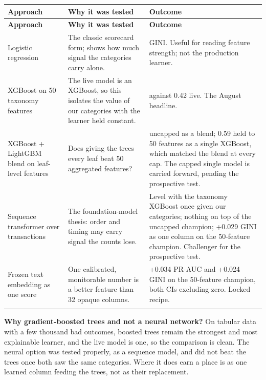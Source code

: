 {\small
\setlength{\TableWidth}{\dimexpr\linewidth-6\tabcolsep\relax}
\begin{longtable}{>{\raggedright\arraybackslash}p{0.29\TableWidth}>{\raggedright\arraybackslash}p{0.26\TableWidth}>{\raggedright\arraybackslash}p{0.45\TableWidth}}
\rowcolor{BlueTint}
\bfseries Approach & \bfseries Why it was tested & \bfseries Outcome \\ \midrule
\endfirsthead
\rowcolor{BlueTint}
\bfseries Approach & \bfseries Why it was tested & \bfseries Outcome \\ \midrule
\endhead
Logistic regression & The classic scorecard form; shows how much signal the categories carry alone. & 0.33 GINI. Useful for reading feature strength; not the production learner. \\ \addlinespace[4pt]
XGBoost on 50 taxonomy features & The live model is an XGBoost, so this isolates the value of our categories with the learner held constant. & 0.56 against 0.42 live. The August headline. \\ \addlinespace[4pt]
XGBoost + LightGBM blend on leaf-level features & Does giving the trees every leaf beat 50 aggregated features? & 0.62 uncapped as a blend; 0.59 held to 50 features as a single XGBoost, which matched the blend at every cap. The capped single model is carried forward, pending the prospective test. \\ \addlinespace[4pt]
Sequence transformer over transactions & The foundation-model thesis: order and timing may carry signal the counts lose. & Level with the taxonomy XGBoost once given our categories; nothing on top of the uncapped champion; +0.029 GINI as one column on the 50-feature champion. Challenger for the prospective test. \\ \addlinespace[4pt]
Frozen text embedding as one score & One calibrated, monitorable number is a better feature than 32 opaque columns. & +0.034 PR-AUC and +0.024 GINI on the 50-feature champion, both CIs excluding zero. Locked recipe. \\ \addlinespace[4pt]
\bottomrule
\end{longtable}}
\textbf{Why gradient-boosted trees and not a neural network?} On tabular data with a few thousand bad outcomes, boosted trees remain the strongest and most explainable learner, and the live model is one, so the comparison is clean. The neural option was tested properly, as a sequence model, and did not beat the trees once both saw the same categories. Where it does earn a place is as one learned column feeding the trees, not as their replacement.

